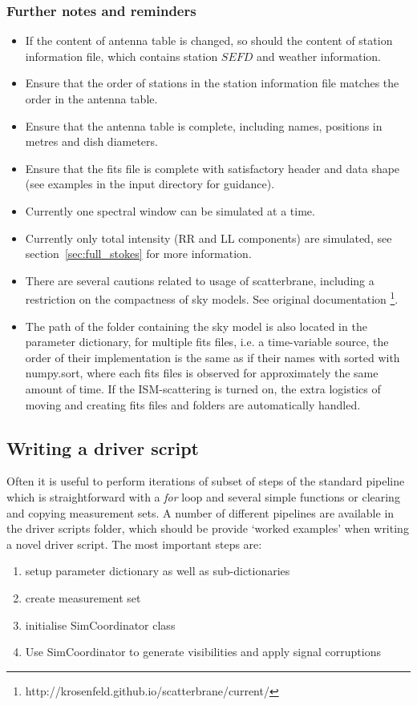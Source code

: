 \subsubsection{Further notes and reminders}
\begin{itemize}
 \item If the content of antenna table is changed, so should the content of station information file, which contains station $SEFD$ and weather information. 
 \item Ensure that the order of stations in the station information file matches the order in the antenna table.
 \item Ensure that the antenna table is complete, including names, positions in metres and dish diameters.
 \item Ensure that the {\sc fits} file is complete with satisfactory header and data shape (see examples in the input directory for guidance).
 \item Currently one spectral window can be simulated at a time.
 \item Currently only total intensity (RR and LL components) are simulated, see section~\ref{sec:full_stokes} for more information.
 \item There are several cautions related to usage of {\sc scatterbrane}, including a restriction on the compactness of sky models. See original documentation \footnote{http://krosenfeld.github.io/scatterbrane/current/}. 
 \item The path of the folder containing the sky model is also located in the parameter dictionary, for multiple fits files, i.e. a time-variable source, the order of their implementation is the same as if their names with sorted with numpy.sort, where each fits files is observed for approximately the same amount of time. If the ISM-scattering is turned on, the extra logistics of moving and creating fits files and folders are automatically handled.
\end{itemize}

\subsection{Writing a driver script}
 
Often it is useful to perform iterations of subset of steps of the standard pipeline which is straightforward with a \emph{for} loop and several simple functions or clearing and copying measurement sets. A number of different pipelines are available in the driver scripts folder, which should be provide `worked examples' when writing a novel driver script. The most important steps are:
\begin{enumerate}
 \item setup parameter dictionary as well as sub-dictionaries
 \item create measurement set
 \item initialise SimCoordinator class
 \item Use SimCoordinator to generate visibilities and apply signal corruptions
\end{enumerate}

